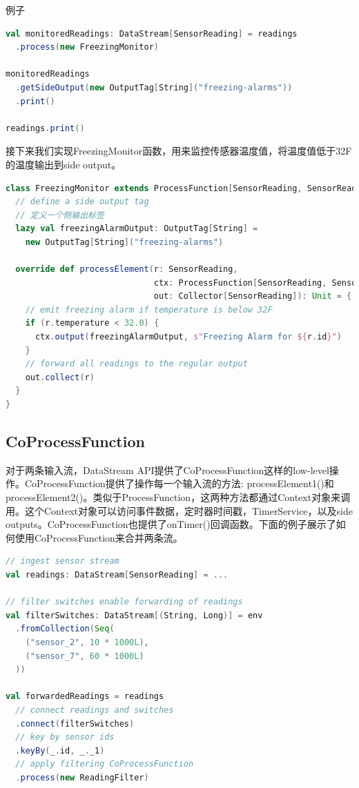 \documentclass[oneside]{ctexbook}
\begin{document}
例子

\begin{lstlisting}[language=scala]
val monitoredReadings: DataStream[SensorReading] = readings
  .process(new FreezingMonitor)

monitoredReadings
  .getSideOutput(new OutputTag[String]("freezing-alarms"))
  .print()

readings.print()
\end{lstlisting}

接下来我们实现FreezingMonitor函数，用来监控传感器温度值，将温度值低于32F的温度输出到side output。

\begin{lstlisting}[language=scala]
class FreezingMonitor extends ProcessFunction[SensorReading, SensorReading] {
  // define a side output tag
  // 定义一个侧输出标签
  lazy val freezingAlarmOutput: OutputTag[String] =
    new OutputTag[String]("freezing-alarms")

  override def processElement(r: SensorReading,
                              ctx: ProcessFunction[SensorReading, SensorReading]#Context,
                              out: Collector[SensorReading]): Unit = {
    // emit freezing alarm if temperature is below 32F
    if (r.temperature < 32.0) {
      ctx.output(freezingAlarmOutput, s"Freezing Alarm for ${r.id}")
    }
    // forward all readings to the regular output
    out.collect(r)
  }
}
\end{lstlisting}

\subsection{CoProcessFunction}

对于两条输入流，DataStream API提供了CoProcessFunction这样的low-level操作。CoProcessFunction提供了操作每一个输入流的方法: processElement1()和processElement2()。类似于ProcessFunction，这两种方法都通过Context对象来调用。这个Context对象可以访问事件数据，定时器时间戳，TimerService，以及side outputs。CoProcessFunction也提供了onTimer()回调函数。下面的例子展示了如何使用CoProcessFunction来合并两条流。

\begin{lstlisting}[language=scala]
// ingest sensor stream
val readings: DataStream[SensorReading] = ...

// filter switches enable forwarding of readings
val filterSwitches: DataStream[(String, Long)] = env
  .fromCollection(Seq(
    ("sensor_2", 10 * 1000L),
    ("sensor_7", 60 * 1000L)
  ))

val forwardedReadings = readings
  // connect readings and switches
  .connect(filterSwitches)
  // key by sensor ids
  .keyBy(_.id, _._1)
  // apply filtering CoProcessFunction
  .process(new ReadingFilter)
\end{lstlisting}
\end{document}
